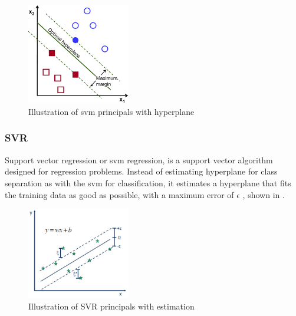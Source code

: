 \documentclass[english, a4paper]{report}
\begin{document}
{{{            \begin{figure}[H]
                \centering
                \includegraphics[width=0.4\textwidth]{SVM-easy}
                \caption{Illustration of \gls{svm} principals with hyperplane \cite{openCV-SVMfig}}
                \label{fig:SVM-easy}
            \end{figure}
            
            \subsubsection{SVR}
            {
                Support vector regression or \gls{svm} regression, is a support vector algorithm designed for regression problems. Instead of estimating hyperplane for class separation as with the \gls{svm} for classification, it estimates a hyperplane that fits the training data as good as possible, with a maximum error of \begin{math} \epsilon \end{math} \cite{guideSVR}, shown in .
                
                \begin{figure}[H]
                    \centering \includegraphics[width=0.4\textwidth]{e-svr}
                    \caption{Illustration of SVR principals with estimation \cite{introSVR}}
                    \label{fig:SVR-easy}
                \end{figure}
            }
            
}}}
\end{document}
